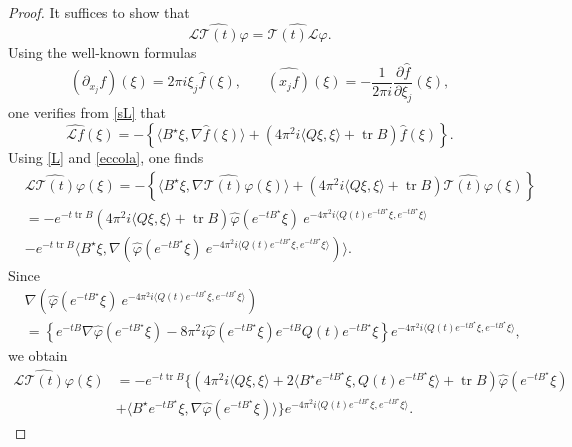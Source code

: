 \documentclass[11pt,a4paper]{amsart}
\def \vf{\varphi}
\newcommand{\p}{\partial}
\numberwithin{equation}{section}
\newcommand{\tr}{\operatorname{tr}}
\newcommand{\sa}{\langle}
\newcommand{\da}{\rangle}
\numberwithin{equation}{section}
\begin{document}
\begin{proof}
It suffices to show that 
\begin{equation}\label{Lft}
\widehat{\mathscr L \mathcal T(t) \vf} = \widehat{\mathcal T(t) \mathscr L  \vf}.
\end{equation}
Using the well-known formulas 
\begin{equation*}
\widehat{(\p_{x_j} f)}(\xi) = 2\pi i \xi_j \hat f(\xi),\ \ \ \ \ \ \ \ \widehat{(x_j f)}(\xi) = - \frac{1}{2\pi i} \frac{\p \hat f}{\p \xi_j}(\xi),
\end{equation*}
one verifies from \eqref{sL} that
\begin{equation}\label{L}
\widehat{\mathscr L f}(\xi) = - \left\{\sa B^\star \xi, \nabla \hat f(\xi)\da + \left(4 \pi^2 i \sa Q\xi,\xi\da + \tr B\right) \hat f(\xi)\right\}.
\end{equation}
Using \eqref{L} and \eqref{eccola}, one finds
\begin{align*}
& \widehat{\mathscr L \mathcal T(t) \vf}(\xi) = - \left\{\sa B^\star \xi, \nabla \widehat{\mathcal T(t) \vf}(\xi)\da + \left(4 \pi^2 i \sa Q\xi,\xi\da + \tr B\right) \widehat{\mathcal T(t) \vf}(\xi)\right\}
\\
& = - e^{-t \tr B} \left(4 \pi^2 i \sa Q\xi,\xi\da + \tr B\right) \hat \vf(e^{-tB^\star}\xi) \  e^{-4\pi^2 i  \sa Q(t) e^{-tB^\star}\xi,e^{-tB^\star}\xi\da}
\\
& - e^{-t \tr B} \sa B^\star \xi, \nabla \left(\hat \vf(e^{-tB^\star}\xi) \  e^{-4\pi^2 i  \sa Q(t) e^{-tB^\star}\xi,e^{-tB^\star}\xi\da}\right)\da.
\end{align*}
Since
\begin{align*}
& \nabla \left(\hat \vf(e^{-tB^\star}\xi) \  e^{-4\pi^2 i  \sa Q(t) e^{-tB^\star}\xi,e^{-tB^\star}\xi\da}\right) 
\\
& = \left\{e^{-tB} \nabla \hat \vf(e^{-tB^\star}\xi) -  8\pi^2 i \hat \vf(e^{-tB^\star}\xi) e^{-tB} Q(t) e^{-tB^\star}\xi\right\} e^{-4\pi^2 i  \sa Q(t) e^{-tB^\star}\xi,e^{-tB^\star}\xi\da},
\end{align*}
we obtain
\begin{align*}
\widehat{\mathscr L \mathcal T(t) \vf}(\xi) & = - e^{-t \tr B} \bigg\{\left(4 \pi^2 i \sa Q\xi,\xi\da + 2 \sa B^\star e^{-tB^\star} \xi, Q(t) e^{-tB^\star}\xi\da+ \tr B\right) \hat \vf(e^{-tB^\star}\xi) 
\\
& + \sa B^\star e^{-tB^\star} \xi, \nabla \hat \vf(e^{-tB^\star}\xi)\da\bigg\}  e^{-4\pi^2 i  \sa Q(t) e^{-tB^\star}\xi,e^{-tB^\star}\xi\da}.
\end{align*}

\end{proof}
\end{document}
